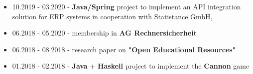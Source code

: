 \documentclass[11pt,a4paper]{altacv}
\begin{document}
\begin{itemize}
    \item 10.2019 - 03.2020 - \textbf{Java/Spring} project to implement an API integration solution  for ERP systems in cooperation with \href{https://www.statistance.de/}{Statistance GmbH},
    \item 06.2018 - 05.2020 - membership in \textbf{AG Rechnersicherheit}
    \item 06.2018 - 08.2018 - research paper on \textbf{"Open Educational Resources"}
    \item 01.2018 - 02.2018 - \textbf{Java} + \textbf{Haskell} project to implement the \textbf{Cannon} game
\end{itemize}
\begin{comment}
With particular focus on following courses:\\
- Algorithms and Data Structures\\
- Computer Networks and Distributed Systems\\
- Software Engineering and Programming Paradigms\\
- Cognitive Algorithms\\
- Data Warehousing and Business Intelligence\\
- Webtechnologies\\- Electronic Commerce\\
\textbf{With completed following projects:}
\\- Distributed Hash Table System\\ 
\hspace*{0.075cm} used technologies: \textbf{C}
\\- Single Page Application\\ \hspace*{0.075cm} used technologies: \textbf{HTML5}, \textbf{CSS3}, \textbf{JS}, \textbf{jQuery}, \textbf{Bootstrap} 
\end{comment}
\end{document}
